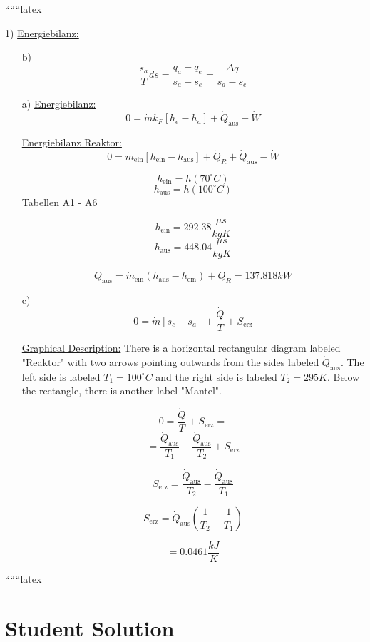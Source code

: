 
``````latex

1) \underline{Energiebilanz:}

\begin{itemize}
    \item[b)] \[
    \frac{s_a}{T} ds = \frac{q_a - q_e}{s_a - s_e} = \frac{\Delta q}{s_a - s_e}
    \]
    
    \item[a)] \underline{Energiebilanz:}
    \[
    0 = \dot{m} k_F \left[ h_e - h_a \right] + \dot{Q}_{\text{aus}} - \dot{W}
    \]
    
    \underline{Energiebilanz Reaktor:}
    \[
    0 = \dot{m}_{\text{ein}} \left[ h_{\text{ein}} - h_{\text{aus}} \right] + \dot{Q}_R + \dot{Q}_{\text{aus}} - \dot{W}
    \]
    
    \[
    h_{\text{ein}} = h(70^\circ C)
    \]
    \[
    h_{\text{aus}} = h(100^\circ C)
    \]
    Tabellen A1 - A6
    
    \[
    h_{\text{ein}} = 292.38 \frac{\mu s}{kg K}
    \]
    \[
    h_{\text{aus}} = 448.04 \frac{\mu s}{kg K}
    \]
    
    \[
    \dot{Q}_{\text{aus}} = \dot{m}_{\text{ein}} (h_{\text{aus}} - h_{\text{ein}}) + \dot{Q}_R = 137.818 kW
    \]
    
    \item[c)] \[
    0 = \dot{m} \left[ s_c - s_a \right] + \frac{\dot{Q}}{T} + S_{\text{erz}}
    \]
    
    \underline{Graphical Description:}
    There is a horizontal rectangular diagram labeled "Reaktor" with two arrows pointing outwards from the sides labeled $\dot{Q}_{\text{aus}}$. The left side is labeled $T_1 = 100^\circ C$ and the right side is labeled $T_2 = 295K$. Below the rectangle, there is another label "Mantel".
    
    \[
    0 = \frac{\dot{Q}}{T} + S_{\text{erz}} =
    \]
    \[
    = \frac{\dot{Q}_{\text{aus}}}{T_1} - \frac{\dot{Q}_{\text{aus}}}{T_2} + S_{\text{erz}}
    \]
    
    \[
    S_{\text{erz}} = \frac{\dot{Q}_{\text{aus}}}{T_2} - \frac{\dot{Q}_{\text{aus}}}{T_1}
    \]
    
    \[
    S_{\text{erz}} = \dot{Q}_{\text{aus}} \left( \frac{1}{T_2} - \frac{1}{T_1} \right)
    \]
    
    \[
    = 0.0461 \frac{kJ}{K}
    \]
\end{itemize}

``````latex


\section*{Student Solution}

